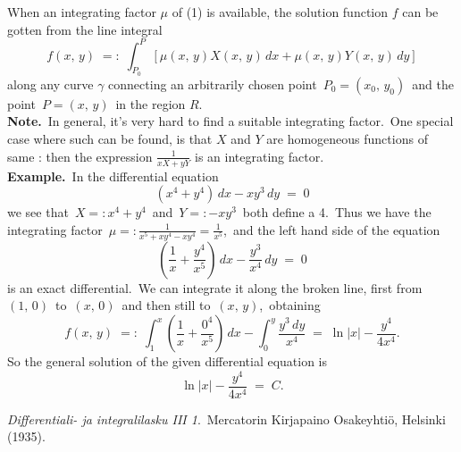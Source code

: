 \documentclass[12pt]{article}
\theoremstyle{definition}
\begin{document}
When an integrating factor $\mu$ of (1) is available, the solution function $f$
can be gotten from the line integral
$$f(x,\,y) \;=:\; \int_{P_0}^P [\mu(x,\,y)X(x,\,y)\,dx+\mu(x,\,y)Y(x,\,y)\,dy]$$
along any curve $\gamma$ connecting an arbitrarily chosen point \,$P_0 =(x_0,\,y_0)$\, and the point\, $P = (x,\,y)$\, in the region $R$.\\

\textbf{Note.}\, In general, it's very hard to find a suitable integrating factor.\, One special case where such can be found, is that $X$ and $Y$ are homogeneous functions of same : then the expression $\displaystyle\frac{1}{xX+yY}$ is an integrating factor.\\

\textbf{Example.}\, In the differential equation
    $$(x^4+y^4)\,dx-xy^3\,dy \;=\; 0$$
we see that\, $X =: x^4+y^4$\, and\, $Y =: -xy^3$\, both define a  4.\, Thus we have the integrating factor\, $\displaystyle\mu =: \frac{1}{x^5+xy^4-xy^4} = \frac{1}{x^5}$,\, and the left hand side of the equation
    $$\left(\frac{1}{x}+\frac{y^4}{x^5}\right)\,dx-\frac{y^3}{x^4}\,dy \;=\; 0$$
is an exact differential.\, We can integrate it along the broken line, first from\, $(1,\,0)$\, to\, $(x,\,0)$\, and then still to\, $(x,\,y)$,\, obtaining
$$f(x,\,y) \;=:\; \int_1^x\left(\frac{1}{x}+\frac{0^4}{x^5}\right)\,dx
-\int_0^y\frac{y^3\,dy}{x^4} \;=\; \ln|x|-\frac{y^4}{4x^4}.$$
So the general solution of the given differential equation is
$$\ln|x|-\frac{y^4}{4x^4} \;=\; C.$$


\begin{thebibliography}{9}
 {\em Differentiali- ja integralilasku III 1}.\, Mercatorin Kirjapaino Osakeyhti\"o, Helsinki (1935).
\end{thebibliography}

\end{document}

